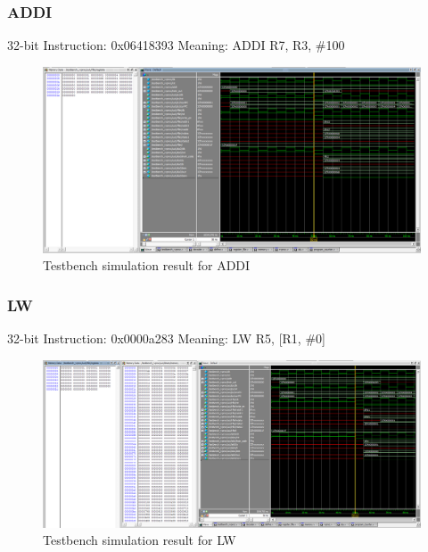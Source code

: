 \subsubsection*{ADDI}
\label{sect6_4_3_2c}

32-bit Instruction: 0x06418393 \newline
Meaning: ADDI R7, R3, \#100

\begin{figure}[h!]
\centering
\includegraphics[width=\linewidth]{figures/RISCV_Implementation_ADDI.PNG}
\caption{Testbench simulation result for ADDI}
\label{fig:riscv11}
\end{figure}

\subsubsection*{LW}
\label{sect6_4_3_2d}

32-bit Instruction: 0x0000a283 \newline
Meaning: LW R5, [R1, \#0]

\begin{figure}[h!]
\centering
\includegraphics[width=\linewidth]{figures/RISCV_Implementation_LW.PNG}
\caption{Testbench simulation result for LW}
\label{fig:riscv12}
\end{figure}


